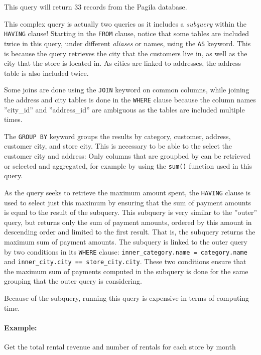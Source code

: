 This query will return 33 records from the Pagila database.

This complex query is actually two queries as it includes a \emph{subquery} within the \texttt{HAVING} clause! Starting in the \texttt{FROM} clause, notice that some tables are included twice in this query, under different \emph{aliases} or names, using the \texttt{AS} keyword. This is because the query retrieves the city that the customers live in, as well as the city that the store is located in. As cities are linked to addresses, the address table is also included twice. 

Some joins are done using the \texttt{JOIN} keyword on common columns, while joining the address and city tables is done in the \texttt{WHERE} clause because the column names ''city\_id'' and ''address\_id'' are ambiguous as the tables are included multiple times. 

The \texttt{GROUP BY} keyword groups the results by category, customer, address, customer city, and store city. This is necessary to be able to the select the customer city and address: Only columns that are groupbed by can be retrieved or selected and aggregated, for example by using the \texttt{sum()} function used in this query. 

As the query seeks to retrieve the maximum amount spent, the \texttt{HAVING} clause is used to select just this maximum by ensuring that the sum of payment amounts is equal to the result of the subquery. This subquery is very similar to the ''outer'' query, but returns only the sum of payment amounts, ordered by this amount in descending order and limited to the first result. That is, the subquery returns the maximum sum of payment amounts. The subquery is linked to the outer query by two conditions in its \texttt{WHERE} clause: \texttt{inner\_category.name = category.name} and \texttt{inner\_city.city == store\_city.city}. These two conditions ensure that the maximum sum of payments computed in the subquery is done for the same grouping that the outer query is considering.

Because of the subquery, running this query is expensive in terms of computing time.

\paragraph*{Example:}
Get the total rental revenue and number of rentals for each store by month


